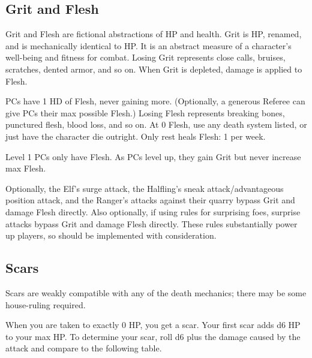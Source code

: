 \documentclass[twoside]{article}
\begin{document}
\subsection*{Grit and Flesh}

Grit and Flesh are fictional abstractions of HP and health. Grit is HP, renamed, and is mechanically identical to HP. It is an abstract measure of a character's well-being and fitness for combat. Losing Grit represents close calls, bruises, scratches, dented armor, and so on. When Grit is depleted, damage is applied to Flesh.

\bigbreak

PCs have 1 HD of Flesh, never gaining more. (Optionally, a generous Referee can give PCs their max possible Flesh.) Losing Flesh represents breaking bones, punctured flesh, blood loss, and so on. At 0 Flesh, use any death system listed, or just have the character die outright. Only rest heals Flesh: 1 per week.

\bigbreak

Level 1 PCs only have Flesh. As PCs level up, they gain Grit but never increase max Flesh.

\bigbreak

Optionally, the Elf's surge attack, the Halfling's sneak attack/advantageous position attack, and the Ranger's attacks against their quarry bypass Grit and damage Flesh directly. Also optionally, if using rules for surprising foes, surprise attacks bypass Grit and damage Flesh directly. These rules substantially power up players, so should be implemented with consideration.

\subsection*{Scars}

Scars are weakly compatible with any of the death mechanics; there may be some house-ruling required.

\bigbreak

When you are taken to exactly 0 HP, you get a scar. Your first scar adds d6 HP to your max HP. To determine your scar, roll d6 plus the damage caused by the attack and compare to the following table.

\bigbreak
\end{document}
